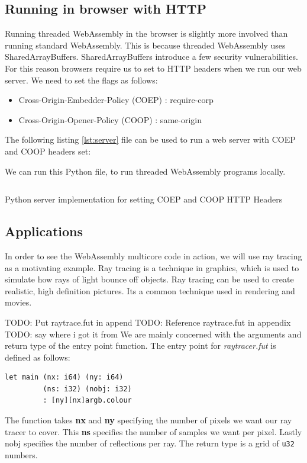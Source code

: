 \documentclass[11pt]{book}
\begin{document}
\subsection{Running in browser with HTTP}

Running threaded WebAssembly in the browser is slightly more involved than running standard WebAssembly. This is because threaded WebAssembly uses SharedArrayBuffers. SharedArrayBuffers introduce a few security vulnerabilities. For this reason browsers require us to set to HTTP headers when we run our web server. We need to set the flags as follows:
\begin{itemize}
    \item Cross-Origin-Embedder-Policy (COEP) : require-corp
    \item Cross-Origin-Opener-Policy (COOP) : same-origin
\end{itemize}

The following listing \ref{lst:server} file can be used to run a web server with COEP and COOP headers set:

We can run this Python file, to run threaded WebAssembly programs locally.

\begin{listing}[H]    
        \inputminted[fontsize=\small,baselinestretch=0.5,linenos]{Python}{code/server.py}
        \caption{Python server implementation for setting COEP and COOP HTTP Headers}    
        \label{lst:server}    
\end{listing} 



\subsection{Applications}

In order to see the WebAssembly multicore code in action, we will use ray tracing as a motivating example. Ray tracing is a technique in graphics, which is used to simulate how rays of light bounce off objects. Ray tracing can be used to create realistic, high definition pictures. Its a common technique used in rendering and movies.

{\color{red} TODO}: Put raytrace.fut in append
{\color{red} TODO}: Reference raytrace.fut in appendix
{\color{red} TODO}: say where i got it from 
We are mainly concerned with the arguments and return type of the entry point function. The entry point for \textit{raytracer.fut} is defined as follows:
\begin{verbatim}
let main (nx: i64) (ny: i64) 
         (ns: i32) (nobj: i32) 
         : [ny][nx]argb.colour
\end{verbatim}
The function takes \textbf{nx} and \textbf{ny} specifying the number of pixels we want our ray tracer to cover. This \textbf{ns} specifies the number of samples we want per pixel. Lastly nobj specifies the number of reflections per ray. The return type is a grid of \texttt{u32} numbers. 
\end{document}
